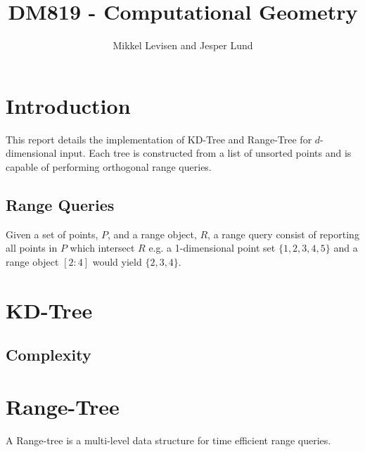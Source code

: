 \documentclass{article}
\newcommand{\subtitle}[1]{%
  \posttitle{%
    \par\end{center}
    \begin{center}\large#1\end{center}
    \vskip0.5em}%
}
\begin{document}
\title{DM819 - Computational Geometry}
\subtitle{Fall 2015\\Project 2}
\author{Mikkel Levisen and Jesper Lund}
\maketitle
\thispagestyle{empty}
\newpage
\tableofcontents
\thispagestyle{empty}
\newpage
\section{Introduction}
  This report details the implementation of KD-Tree and Range-Tree for 
  $d$-dimensional input. Each tree is constructed from a list of unsorted points
  and is capable of performing orthogonal range queries.
  \subsection{Range Queries}
  Given a set of points, $P$, and a range object, $R$, a range query consist of
  reporting all points in $P$ which intersect $R$ e.g. a 1-dimensional point
  set $\{1,2,3,4,5\}$ and a range object $[2:4]$ would yield $\{2,3,4\}$. 
\section{KD-Tree}
\subsection{Complexity}
\section{Range-Tree}
  A Range-tree is a multi-level data structure for time efficient range queries.
%  
\end{document}

